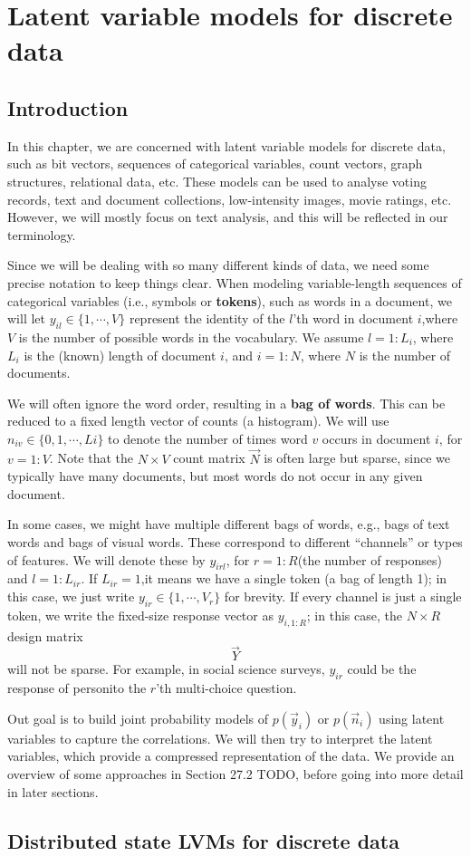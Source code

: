 \chapter{Latent variable models for discrete data}


\section{Introduction}
In this chapter, we are concerned with latent variable models for discrete data, such as bit vectors, sequences of categorical variables, count vectors, graph structures, relational data, etc. These models can be used to analyse voting records, text and document collections, low-intensity images, movie ratings, etc. However, we will mostly focus on text analysis, and this will be reflected in our terminology.

Since we will be dealing with so many different kinds of data, we need some precise notation to keep things clear. When modeling variable-length sequences of categorical variables (i.e., symbols or \textbf{tokens}), such as words in a document, we will let $y_{il} \in \{1,\cdots,V\}$ represent the identity of the $l$'th word in document $i$,where $V$ is the number of possible words in the vocabulary. We assume $l=1:L_i$, where $L_i$ is the (known) length of document $i$, and $i=1:N$, where $N$ is the number of documents.

We will often ignore the word order, resulting in a \textbf{bag of words}. This can be reduced to a fixed length vector of counts (a histogram). We will use $n_{iv} \in \{0,1,\cdots,Li\}$ to denote the number of times word $v$ occurs in document $i$, for $v=1:V$. Note that the $N \times V$ count matrix $\vec{N}$ is often large but sparse, since we typically have many documents, but most words do not occur in any given document.

In some cases, we might have multiple different bags of words, e.g., bags of text words and bags of visual words. These correspond to different “channels” or types of features. We will denote these by $y_{irl}$, for $r=1:R$(the number of responses) and $l=1:L_{ir}$. If $L_{ir} =1$,it means we have a single token (a bag of length 1); in this case, we just write $y_{ir} \in \{1,\cdots,V_r\}$ for brevity. If every channel is just a single token, we write the fixed-size response vector as $y_{i,1:R}$; in this case, the $N \times R$ design matrix $$\vec{Y} $$ will not be sparse. For example, in social science surveys, $y_{ir}$ could be the response of personito the $r$'th multi-choice question.

Out goal is to build joint probability models of $p(\vec{y}_i)$ or $p(\vec{n}_i)$ using latent variables to capture the correlations. We will then try to interpret the latent variables, which provide a compressed representation of the data. We provide an overview of some approaches in Section 27.2 TODO, before going into more detail in later sections.


\section{Distributed state LVMs for discrete data}

